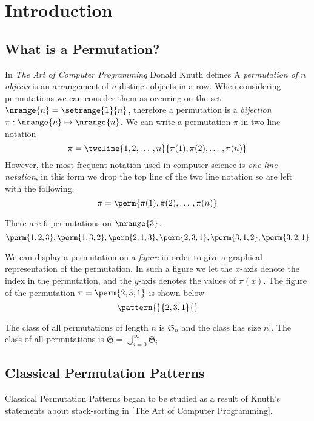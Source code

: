 \chapter{Introduction\label{cha:introduction}}
\section{What is a Permutation?}
In \emph{The Art of Computer Programming} Donald Knuth defines
A \emph{permutation of \(n\) objects} is an arrangement of \(n\) distinct
objects in a row. When considering permutations we can consider them as
occuring on the set \(\nrange{n} = \setrange{1}{n}\), therefore a permutation
is a \emph{bijection} \(\pi:\nrange{n} \mapsto \nrange{n}\). We can write a
permutation \(\pi\) in two line notation
\begin{equation*}
\pi = \twoline{1,2,\dotso,n}{\pi(1),\pi(2),\dotso,\pi(n)}
\end{equation*}
However, the most frequent notation used in computer science is
\emph{one-line notation}, in this form we drop the top line of the two line
notation so are left with the following.
\begin{equation*}
\pi = \perm{\pi(1),\pi(2),\dotso,\pi(n)}
\end{equation*}

\begin{example}
There are 6 permutations on \(\nrange{3}\).
\begin{equation*}
\perm{1,2,3},\perm{1,3,2},\perm{2,1,3},\perm{2,3,1}, \perm{3,1,2}, \perm{3,2,1}
\end{equation*}
\end{example}

We can display a permutation on a \emph{figure} in order to give a graphical
representation of the permutation. In such a figure we let the \(x\)-axis
denote the index in the permutation, and the \(y\)-axis denotes the values of
\(\pi(x)\). The figure of the permutation \(\pi = \perm{2,3,1}\) is shown below
\begin{equation*}
    \pattern{}{2,3,1}{}
\end{equation*}

The class of all permutations of length \(n\) is \(\mathfrak{S}_n\) and
the class has size \(n!\). The class of all permutations is
\(\mathfrak{S}=\bigcup_{i=0}^{\infty}\mathfrak{S}_i\).

\section{Classical Permutation Patterns}
Classical Permutation Patterns began to be studied as a result of Knuth's
statements about stack-sorting in [The Art of Computer Programming].

